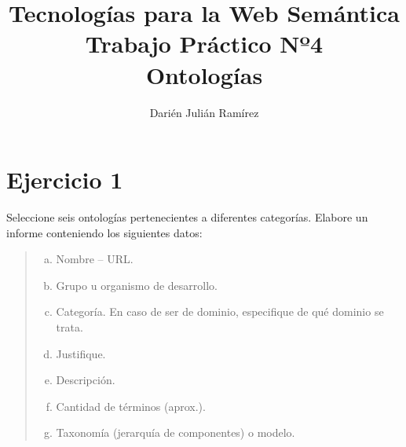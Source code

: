 \documentclass[a4paper,12pt,oneside,final,spanish]{article}
\title{\Huge Tecnologías para la Web Semántica\\
Trabajo Práctico Nº4\\
Ontologías}
\author{Darién Julián Ramírez}
\date{\vspace{-5ex}}
\begin{document}
\maketitle %

\section*{Ejercicio 1}

Seleccione seis ontologías pertenecientes a diferentes categorías. Elabore un informe conteniendo los siguientes datos:
\begin{quote}
\begin{enumerate}[a.]
\item Nombre – URL.
\item Grupo u organismo de desarrollo.
\item Categoría. En caso de ser de dominio, especifique de qué dominio se trata. \item Justifique.
\item Descripción.
\item Cantidad de términos (aprox.).
\item Taxonomía (jerarquía de componentes) o modelo.
\end{enumerate}
\end{quote}

\dotfill
\end{document}
